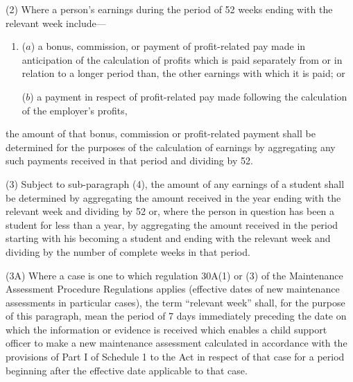 \documentclass[12pt,a4paper]{article}
\begin{document}

(2) Where a person’s earnings during the period of 52 weeks ending with the relevant week include—
\begin{enumerate}\item[]
($a$) a bonus, commission, or payment of profit-related pay made in anticipation of the calculation of profits which is paid separately from or in relation to a longer period than, the other earnings with which it is paid; or

($b$) a payment in respect of profit-related pay made following the calculation of the employer’s profits,
\end{enumerate}
the amount of that bonus, commission or profit-related payment shall be determined for the purposes of the calculation of earnings by aggregating any such payments received in that period and dividing by 52.

(3) Subject to sub-paragraph (4), the amount of any earnings of a student shall be determined by aggregating the amount received in the year ending with the relevant week and dividing by 52 or, where the person in question has been a student for less than a year, by aggregating the amount received in the period starting with his becoming a student and ending with the relevant week and dividing by the number of complete weeks in that period.

(3A) Where a case is one to which regulation 30A(1) or (3) of the Maintenance Assessment Procedure Regulations applies (effective dates of new maintenance assessments in particular cases), the term “relevant week” shall, for the purpose of this paragraph, mean the period of 7 days immediately preceding the date on which the information or evidence is received which enables a child support officer to make a new maintenance assessment calculated in accordance with the provisions of Part I of Schedule 1 to the Act in respect of that case for a period beginning after the effective date applicable to that case.
\end{document}
